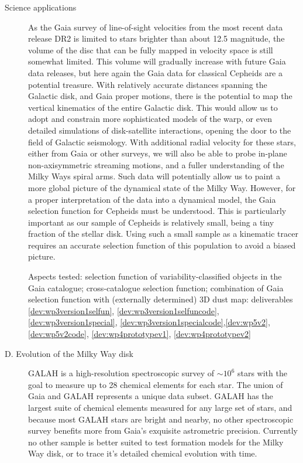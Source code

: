 \begin{workpackage}{Science applications}
\begin{wpobjectives}
\begin{description}
{        As the Gaia survey of line-of-sight velocities from the most recent data release DR2 is limited to stars brighter than about 12.5 magnitude, the volume of the disc that can be fully mapped in velocity space is still somewhat limited. This volume will gradually increase with future Gaia data releases, but here again the Gaia data for classical Cepheids are a potential treasure. With relatively accurate distances spanning the Galactic disk, and Gaia proper motions, there is the potential to map the vertical kinematics of the entire Galactic disk. This would allow us to adopt and constrain more sophisticated models of the warp, or even detailed simulations of disk-satellite interactions, opening the door to the field of Galactic seismology. With additional radial velocity for these stars, either from Gaia or other surveys, we will also be able to probe in-plane non-axisymmetric streaming motions, and a fuller understanding of the Milky Ways spiral arms. Such data will potentially allow us to paint a more global picture of the dynamical state of the Milky Way. However, for a proper interpretation of the data into a dynamical model, the Gaia selection function for Cepheids must be understood. This is particularly important as our sample of Cepheids is relatively small, being a tiny fraction of the stellar disk. Using such a small sample as a kinematic tracer requires an accurate selection function of this population to avoid a biased picture. 
        
        \textsf{Aspects tested: selection function of variability-classified objects in the Gaia catalogue; cross-catalogue selection function; combination of Gaia selection function with (externally determined) 3D dust map: deliverables \ref{dev:wp3version1selfun}, \ref{dev:wp3version1selfuncode}, \ref{dev:wp3version1special}, \ref{dev:wp3version1specialcode},\ref{dev:wp5v2}, \ref{dev:wp5v2code}, \ref{dev:wp4prototypev1}, \ref{dev:wp4prototypev2}}
     }
     
     \item[D. Evolution of the Milky Way disk]
        {GALAH is a high-resolution spectroscopic survey of $\sim10^6$ stars with the goal to measure up to 28 chemical elements for each star. The union of Gaia and GALAH represents a unique data subset. GALAH has the largest suite of chemical elements measured for any large set of stars, and because most GALAH stars are bright and nearby, no other spectroscopic survey benefits more from Gaia's exquisite astrometric precision. Currently no other sample is better suited to test formation models for the Milky Way disk, or to trace it's detailed chemical evolution with time.
      
}
\end{description}
\end{wpobjectives}
\end{workpackage}
